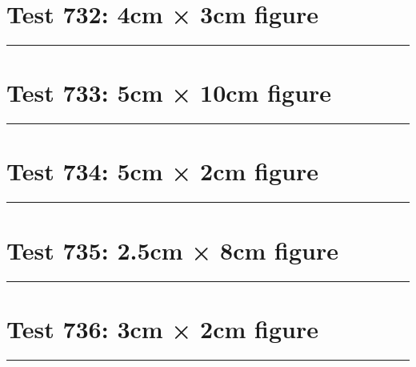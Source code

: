 \documentclass[a4paper,11pt]{article}
\begin{document}
\section*{Test 732: 4cm × 3cm figure}
\begin{swarmwrap}%
  \begin{minipage}[t]{4cm}
    \centering
    \rule{\linewidth}{3cm}
  \end{minipage}%
\end{swarmwrap}%
\swarmwrapnext
\lipsum[70]
\lipsum[71]
\lipsum[72]
\section*{Test 733: 5cm × 10cm figure}
\begin{swarmwrap}%
  \begin{minipage}[t]{5cm}
    \centering
    \rule{\linewidth}{10cm}
  \end{minipage}%
\end{swarmwrap}%
\swarmwrapnext
\lipsum[140]
\lipsum[141]
\lipsum[142]
\lipsum[143]
\lipsum[144]
\section*{Test 734: 5cm × 2cm figure}
\begin{swarmwrap}%
  \begin{minipage}[t]{5cm}
    \centering
    \rule{\linewidth}{2cm}
  \end{minipage}%
\end{swarmwrap}%
\swarmwrapnext
\lipsum[141]
\lipsum[142]
\lipsum[143]
\lipsum[144]
\lipsum[145]
\lipsum[146]
\section*{Test 735: 2.5cm × 8cm figure}
\begin{swarmwrap}%
  \begin{minipage}[t]{2cm}
    \centering
    \rule{\linewidth}{8cm}
  \end{minipage}%
\end{swarmwrap}%
\swarmwrapnext
\lipsum[65]
\lipsum[66]
\lipsum[67]
\section*{Test 736: 3cm × 2cm figure}
\begin{swarmwrap}%
  \begin{minipage}[t]{3cm}
    \centering
    \rule{\linewidth}{2cm}
  \end{minipage}%
\end{swarmwrap}%
\swarmwrapnext
\lipsum[69]
\lipsum[70]
\lipsum[71]
\lipsum[72]
\lipsum[73]
\lipsum[74]
\end{document}
